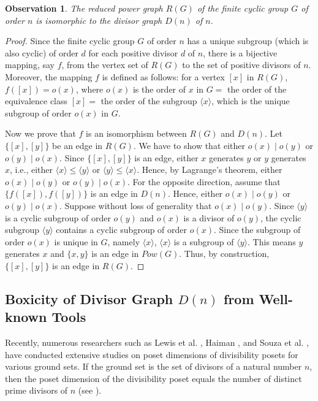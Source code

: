 \documentclass[twoside, 11pt]{article}
\newtheorem{observation}{Observation}
\begin{document}
\begin{observation}\label{reduced power graph is a divisor graph}
 The reduced power graph $R(G)$ of the finite cyclic group $G$ of order $n$ is isomorphic to the divisor graph $D(n)$ of $n$.
\end{observation}
\begin{proof}
    Since the finite cyclic group $G$ of order $n$ has a unique subgroup (which is also cyclic) of order $d$ for each positive divisor $d$ of $n$, there is a bijective mapping, say $f$, from the vertex set of $R(G)$ to the set of positive divisors of $n$. Moreover, the mapping $f$ is defined as follows: for a vertex $[x]$ in $R(G)$, $f([x])=o(x)$, where $o(x)$ is the order of $x$ in $G=$ the order of the equivalence class $[x]=$   the order of the subgroup $\langle x \rangle$, which is the unique subgroup of order $o(x)$ in $G$.

    Now we prove that $f$ is an isomorphism between $R(G)$ and $D(n)$. Let $\{[x],[y]\}$ be  an edge in $R(G)$. We have to show that either $o(x) \mid o(y)$ or $o(y) \mid o(x)$. Since $\{[x],[y]\}$ is an edge, either $x$ generates $y$ or $y$ generates $x$, i.e., either $\langle x \rangle  \leq \langle y \rangle $ or $\langle y \rangle  \leq \langle x \rangle $. Hence, by Lagrange's theorem, either $o(x) \mid o(y)$ or $o(y) \mid o(x)$. For the opposite direction, assume that $\{f([x]),f([y])\}$ is an edge in $D(n)$. Hence, either $o(x) \mid o(y)$ or $o(y) \mid o(x)$. Suppose without loss of generality that $o(x) \mid o(y)$. Since $\langle y \rangle$ is a cyclic subgroup of order $o(y)$ and $o(x)$ is a divisor of $o(y)$,  the cyclic subgroup $\langle y \rangle $ contains a cyclic subgroup of order $o(x)$. Since the subgroup of order $o(x)$ is unique in $G$, namely $\langle x \rangle$,  $\langle x \rangle $ is a subgroup of $\langle y \rangle$. This means $y$ generates $x$ and $\{x,y\}$ is an edge in $Pow(G)$. Thus, by construction, $\{[x],[y]\}$ is an edge in $R(G)$.
\end{proof}


\subsection{Boxicity of Divisor Graph $D(n)$ from Well-known Tools}\label{intro: box of divisor graph}

 Recently, numerous researchers such as Lewis et al. \cite{lewis2021order}, Haiman \cite{haiman2023dimension}, and Souza et al. \cite{souza2024improved}, have conducted extensive studies on poset dimensions of divisibility posets for various ground sets. If the ground set is the set of divisors of a natural number $n$, then the poset dimension of the divisibility poset equals the number of distinct prime divisors of $n$ (see \cite{lewis2021order}).
\end{document}

